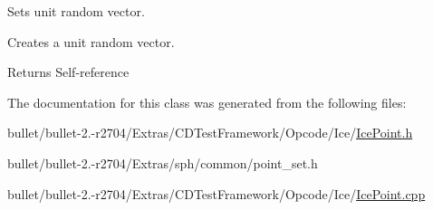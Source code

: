 Sets unit random vector. 

Creates a unit random vector. \begin{DoxyReturn}{Returns}
Self-\/reference 
\end{DoxyReturn}


The documentation for this class was generated from the following files\+:\begin{DoxyCompactItemize}
\item 
bullet/bullet-\/2.-\/r2704/\+Extras/\+C\+D\+Test\+Framework/\+Opcode/\+Ice/\hyperlink{_ice_point_8h}{Ice\+Point.\+h}\item 
bullet/bullet-\/2.-\/r2704/\+Extras/sph/common/point\+\_\+set.\+h\item 
bullet/bullet-\/2.-\/r2704/\+Extras/\+C\+D\+Test\+Framework/\+Opcode/\+Ice/\hyperlink{_ice_point_8cpp}{Ice\+Point.\+cpp}\end{DoxyCompactItemize}
